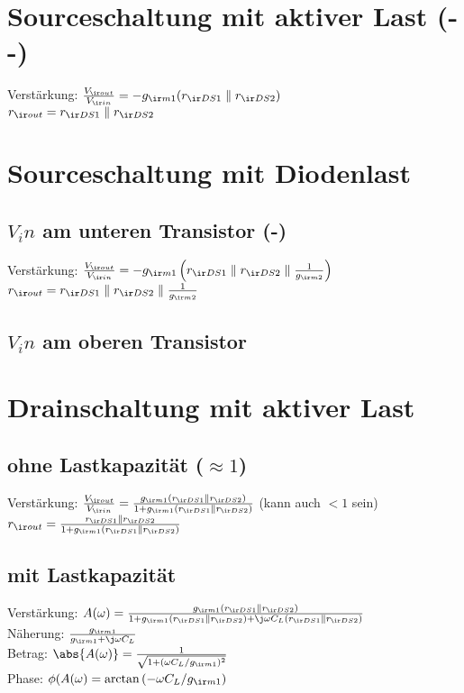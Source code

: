 \documentclass[european]{latex4ei_sheet}
\begin{document}
\section{Sourceschaltung mit aktiver Last (- -)}
Verstärkung: $\frac{V_{\ir out}}{V_{\ir in}} = -g_{\ir m1}(r_{\ir DS1}\parallel r_{\ir DS2})$\\
$r_{\ir out} = r_{\ir DS1}\parallel r_{\ir DS2}$
\section{Sourceschaltung mit Diodenlast}
	\subsection{$V_in$ am unteren Transistor (-)}
	Verstärkung: $\frac{V_{\ir out}}{V_{\ir in}} = -g_{\ir m1}\left( r_{\ir DS1}\parallel r_{\ir DS2}\parallel \frac{1}{g_{\ir m2}}\right)$\\
	$r_{\ir out} = r_{\ir DS1}\parallel r_{\ir DS2}\parallel \frac{1}{g_{\ir m2}}$
	\subsection{$V_in$ am oberen Transistor}

\section{Drainschaltung mit aktiver Last}
	\subsection{ohne Lastkapazität ($\approx 1$)}
	Verstärkung: $\frac{V_{\ir out}}{V_{\ir in}} = \frac{g_{\ir m1}(r_{\ir DS1}\parallel r_{\ir DS2})}{1 + g_{\ir m1}(r_{\ir DS1}\parallel r_{\ir DS2})}$ (kann auch $<1$ sein)\\
	$r_{\ir out} = \frac{r_{\ir DS1}\parallel r_{\ir DS2}}{1 + g_{\ir m1}(r_{\ir DS1}\parallel r_{\ir DS2})}$
	\subsection{mit Lastkapazität}
	Verstärkung: $A(\omega) = \frac{g_{\ir m1}(r_{\ir DS1}\parallel r_{\ir DS2})}{1 + g_{\ir m1}(r_{\ir DS1}\parallel r_{\ir DS2})+\j\omega C_L(r_{\ir DS1}\parallel r_{\ir DS2})}$\\
	Näherung: $\frac{g_{\ir m1}}{g_{\ir m1}+\j\omega C_L}$\\
	Betrag: $\abs{A(\omega)} = \frac{1}{\sqrt{1+(\omega C_L / g_{\ir m1})^2}}$\\
	Phase: $\phi(A(\omega) = \arctan{(-\omega C_L / g_{\ir m1})}$\\
\end{document}
